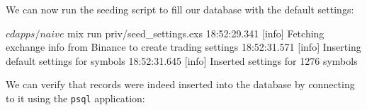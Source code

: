 \documentclass[
  oneside]{book}
\newenvironment{Shaded}{\begin{snugshade}}{\end{snugshade}}
\newcommand{\ExtensionTok}[1]{#1}
\newcommand{\NormalTok}[1]{#1}
\begin{document}
We can now run the seeding script to fill our database with the default settings:

\begin{Shaded}
\begin{Highlighting}[]
\ExtensionTok{$}\NormalTok{ cd apps/naive}
\ExtensionTok{$}\NormalTok{ mix run priv/seed\_settings.exs}
\ExtensionTok{18:52:29.341}\NormalTok{ [info]  Fetching exchange info from Binance to create trading settings}
\ExtensionTok{18:52:31.571}\NormalTok{ [info]  Inserting default settings for symbols}
\ExtensionTok{18:52:31.645}\NormalTok{ [info]  Inserted settings for 1276 symbols}
\end{Highlighting}
\end{Shaded}

We can verify that records were indeed inserted into the database by connecting to it using the \texttt{psql} application:
\end{document}
